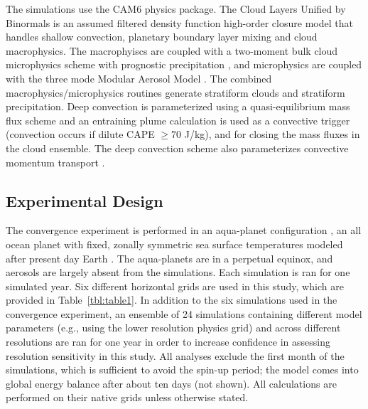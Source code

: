 \documentclass[times]{qjrms4}
\begin{document}
The simulations use the CAM6 physics package. The Cloud Layers Unified by Binormals \citep[CLUBB][]{GETAL2002JAS,BOG2013JCLIM} is an assumed filtered density function \citep{G1992JFM} high-order closure model that handles shallow convection, planetary boundary layer mixing and cloud macrophysics. The macrophyiscs are coupled with a two-moment bulk cloud microphysics scheme with prognostic precipitation \citep{MG2}, and microphysics are coupled with the three mode Modular Aerosol Model \citep{MAM}. The combined macrophysics/microphysics routines generate stratiform clouds and stratiform precipitation. Deep convection is parameterized using a quasi-equilibrium mass flux scheme \citep{ZM1995AO} and an entraining plume calculation \citep[referred to as the dilute convective available potential energy, or {\em{dilute CAPE}} hereafter;][]{RB1992JAS, NRJ2008JC} is used as a convective trigger (convection occurs if dilute CAPE $\geq 70$ J/kg), and for closing the mass fluxes in the cloud ensemble. The deep convection scheme also parameterizes convective momentum transport \citep{RR2008JC}.

\subsection{Experimental Design}

The convergence experiment is performed in an aqua-planet configuration \citep{NH2000ASL,MWO2016JAMES}, an all ocean planet with fixed, zonally symmetric sea surface temperatures modeled after present day Earth \citep[$QOBS$ in][]{NH2000ASL}. The aqua-planets are in a perpetual equinox, and aerosols are largely absent from the simulations. Each simulation is ran for one simulated year. Six different horizontal grids are used in this study, which are provided in Table~\ref{tbl:table1}. In addition to the six simulations used in the convergence experiment, an ensemble of 24 simulations containing different model parameters (e.g., using the lower resolution physics grid) and across different resolutions are ran for one year in order to increase confidence in assessing resolution sensitivity in this study. All analyses exclude the first month of the simulations, which is sufficient to avoid the spin-up period; the model comes into global energy balance after about ten days (not shown). All calculations are performed on their native grids unless otherwise stated.
\end{document}
